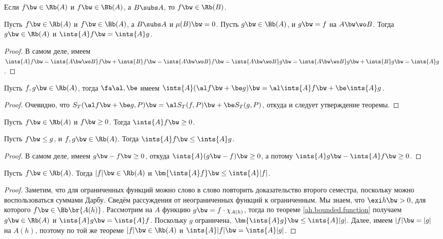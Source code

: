 \documentclass[a4paper]{article}
\begin{document}
\begin{imp}
Если $f \bw\in \Rb(A)$ и $f \bw\in \Bb(A)$, а $B \subs A$, то $f \bw\in \Rb(B)$.
\end{imp}

\begin{imp}
Пусть $f \bw\in \Rb(A)$ и $f \bw\in \Bb(A)$, а $B \subs A$ и $\mu(B) \bw= 0$. Пусть $g \bw\in \Bb(A)$, и $g \bw=
f$ на $A \bw\wo B$. Тогда $g \bw\in \Rb(A)$ и $\ints{A} f\bw= \ints{A} g$.
\end{imp}
\begin{proof}
В самом деле, имеем $\ints{A} f\bw=\ints{A\bw\wo B} f \bw+ \ints{B} f \bw= \ints{A\bw\wo B} f \bw=
\ints{A \bw\wo B} g \bw= \ints{A \bw\wo B} g \bw+ \ints{B} g\bw= \ints{A} g$.
\end{proof}

\begin{theorem}
Пусть $f, g\bw\in \Rb(A)$, тогда $\fa \al, \be$ имеем $\ints{A} (\al f \bw+ \be g) \bw=
\al\ints{A} f \bw+ \be \ints{A} g$.
\end{theorem}
\begin{proof}
Очевидно, что $S_T(\al f \bw+ \be g, P) \bw= \al S_T(f, P) \bw+ \be S_T(g,P)$,
откуда и следует утверждение теоремы.
\end{proof}

\begin{theorem}
Пусть $f \bw\in \Rb(A)$ и $f \bw\ge 0$. Тогда $\ints{A} f \bw\ge 0$.
\end{theorem}

\begin{theorem}
Пусть $f \bw\le g$, и $f, g\bw\in \Rb(A)$. Тогда $\ints{A} f \bw\le \ints{A} g$.
\end{theorem}
\begin{proof}
В самом деле, имеем $g \bw- f \bw\ge 0$, откуда $\ints{A}(g \bw- f) \bw\ge 0$, а
потому $\ints{A} g \bw- \ints{A} f \bw\ge 0$.
\end{proof}

\begin{theorem}
Пусть $f \bw\in \Rb(A)$. Тогда $|f| \bw\in \Rb(A)$ и $\bm{\ints{A} f} \bw\le \ints{A} |f|$.
\end{theorem}
\begin{proof}
Заметим, что для ограниченных функций можно слово в слово повторить доказательство
второго семестра, поскольку можно воспользоваться суммами Дарбу. Сведём рассуждения от
неограниченных функций к ограниченным. Мы знаем, что $\exi h \bw> 0$, для которого $f \bw\in
\Bb\br{A(h)}$. Рассмотрим на $A$ функцию $g \bw= f\cdot \chi_{A(h)}$, тогда по теореме
\ref{ah.bounded.function} получаем $g \bw\in \Rb(A)$ и $\ints{A} g \bw= \ints{A} f$. Поскольку $g$
ограничена, $\bm{\ints{A} g} \bw\le \ints{A} |g|$. Далее, имеем $|f| \bw= |g|$ на $A(h)$, поэтому по той
же теореме $|f| \bw\in \Rb(A)$ и $\ints{A}|f| \bw= \ints{A} |g|$.
\end{proof}
\end{document}
